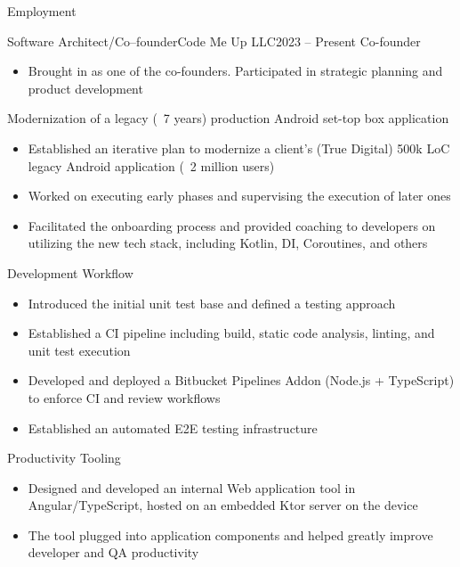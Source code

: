 \documentclass[]{mcdowellcv}
\begin{document}
	\makeheader

	\begin{cvsection}{Employment}
		\begin{cvsubsection}{Software Architect/Co--founder}{Code Me Up LLC}{2023 -- Present}
			Co-founder
			\begin{itemize}
				\item Brought in as one of the co-founders. Participated in strategic planning and product development \newline
			\end{itemize}

			Modernization of a legacy (~7 years) production Android set-top box application
			\begin{itemize}
				\item Established an iterative plan to modernize a client's (True Digital) 500k LoC legacy Android application (~2 million users)
				\item Worked on executing early phases and supervising the execution of later ones
				\item Facilitated the onboarding process and provided coaching to developers on utilizing the new tech stack, including Kotlin, DI, Coroutines, and others \newline
			\end{itemize}

			Development Workflow
			\begin{itemize}
				\item Introduced the initial unit test base and defined a testing approach
				\item Established a CI pipeline including build, static code analysis, linting, and unit test execution
				\item Developed and deployed a Bitbucket Pipelines Addon (Node.js + TypeScript) to enforce CI and review workflows
				\item Established an automated E2E testing infrastructure  \newline
			\end{itemize}

			Productivity Tooling
			\begin{itemize}
				\item Designed and developed an internal Web application tool in Angular/TypeScript, hosted on an embedded Ktor server on the device
				\item The tool plugged into application components and helped greatly improve developer and QA productivity \newline
			\end{itemize}


\end{cvsubsection}
\end{cvsection}
\end{document}
